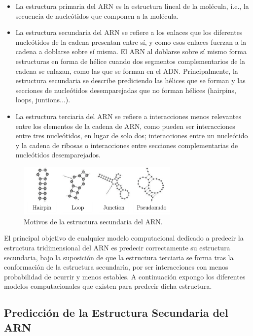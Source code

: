 \documentclass[a4paper,11pt,titlepage]{article}
\theoremstyle{definition}
\begin{document}
\begin{itemize}
    \item La estructura primaria del ARN es la estructura lineal de la molécula, i.e., la secuencia de nucleótidos que componen a la molécula.
    \item La estructura secundaria del ARN se refiere a los enlaces que los diferentes nucleótidos de la cadena presentan entre sí, y como esos enlaces fuerzan a la cadena a doblarse sobre sí misma. El ARN al doblarse sobre sí mismo forma estructuras en forma de hélice cuando dos segmentos complementarios de la cadena se enlazan, como las que se forman en el ADN. Principalmente, la estructura secundaria se describe prediciendo las hélices que se forman y las secciones de nucleótidos desemparejadas que no forman hélices (hairpins, loops, juntions...).
    \item La estructura terciaria del ARN se refiere a interacciones menos relevantes entre los elementos de la cadena de ARN, como pueden ser interacciones entre tres nucleótidos, en lugar de solo dos; interacciones entre un nucleótido y la cadena de ribosas o interacciones entre secciones complementarias de nucleótidos desemparejados.
\end{itemize}

\begin{figure}[H]
    \centering
    \includegraphics[width=0.70\textwidth]{images/RNA_secondary_structure.png}
    \small{\caption{Motivos de la estructura secundaria del ARN.}}\normalsize
    \label{fig:RNA_secondary_structure}
\end{figure}

El principal objetivo de cualquier modelo computacional dedicado a predecir la estructura tridimensional del ARN es predecir correctamente su estructura secundaria, bajo la suposición de que la estructura terciaria se forma tras la conformación de la estructura secundaria, por ser interacciones con menos probabilidad de ocurrir y menos estables. A continuación expongo los diferentes modelos computacionales que existen para predecir dicha estructura.

\subsection{Predicción de la Estructura Secundaria del ARN}\label{subsubsec:thbasis}
\end{document}
